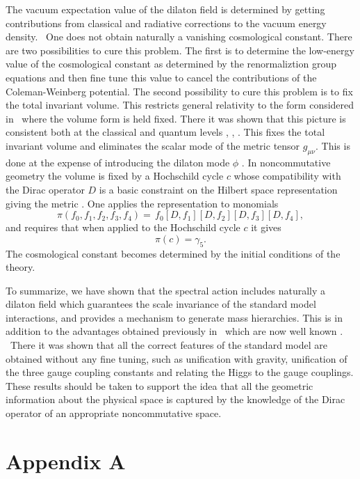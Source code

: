 \documentclass[12pt]{article}%
\begin{document}
The vacuum expectation value of the dilaton field is determined by getting
contributions from classical and radiative corrections to the vacuum energy
density. \ One does not obtain naturally a vanishing cosmological constant.
There are two possibilities to cure this problem. The first is to determine
the low-energy value of the cosmological constant as determined by the
renormaliztion group equations and then fine tune this value to cancel the
contributions of the Coleman-Weinberg potential. The second possibility to
cure this problem is to fix the total invariant volume. This restricts general
relativity to the form considered in \cite{Bud2} \ where the volume form is
held fixed. There it was shown that this picture is consistent both at the
classical and quantum levels \cite{van}, \cite{dragon},\cite{Ng} . This fixes
the total invariant volume and eliminates the scalar mode of the metric tensor
$g_{\mu\nu}.$ This is done at the expense of introducing the dilaton mode
$\phi$ \cite{Bubu}. In noncommutative geometry the volume is fixed by a
Hochschild cycle $c$ whose compatibility with the Dirac operator $D$ is a
basic constraint on the Hilbert space representation giving the metric
\cite{Alain}. One applies the representation to monomials
\[
\pi\left(  f_{0},f_{1},f_{2},f_{3},f_{4}\right)  =\,f_{0}\left[
D,f_{1}\right]  \left[  D,f_{2}\right]  \left[  D,f_{3}\right]  \left[
D,f_{4}\right]  ,
\]
and requires that when applied to the Hochschild cycle $c$ it gives
\[
\pi\left(  c\right)  =\gamma_{5}.
\]
The cosmological constant becomes determined by the initial conditions of the theory.

To summarize, we have shown that the spectral action includes naturally a
dilaton field which guarantees the scale invariance of the standard model
interactions, and provides a mechanism to generate mass hierarchies. This is
in addition to the advantages obtained previously in \cite{ACAC} \ which are
now well known \cite{Kastler}. \ There it was shown that all the correct
features of the standard model are obtained without any fine tuning, such as
unification with gravity, unification of the three gauge coupling constants
and relating the Higgs to the gauge couplings. These results should be taken
to support the idea that all the geometric information about the physical
space is captured by the knowledge of the Dirac operator of an appropriate
noncommutative space.

\section{Appendix A}
\end{document}
